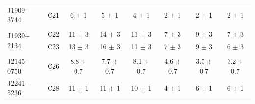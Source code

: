 \documentclass[useAMS,usenatbib]{mn2e}
\begin{document}
\begin{table}
\begin{center}
\begin{tabular}{lccccccc}
J1909$-$3744                  & C21  &6    $\pm$ 1   & 5    $\pm$ 1   & 4    $\pm$ 1    & 2    $\pm$ 1   & 2   $\pm$ 1   & 2   $\pm$ 1   \\ 
                              &      &               &                &                 &                &               &               \\
\multirow{2}{*}{J1939$+$2134} & C22  &11   $\pm$ 3   & 14   $\pm$ 3   & 11   $\pm$ 3    & 7    $\pm$ 3   & 9   $\pm$ 3   & 7   $\pm$ 3   \\ 
                              & C23  &13   $\pm$ 3   & 16   $\pm$ 3   & 11   $\pm$ 3    & 7    $\pm$ 3   & 9   $\pm$ 3   & 6   $\pm$ 3   \\ 
                              &      &               &                &                 &                &               &               \\
J2145$-$0750                  & C26  &8.8  $\pm$ 0.7 & 7.7  $\pm$ 0.7 & 8.1  $\pm$ 0.7  & 4.6  $\pm$ 0.7 & 3.5 $\pm$ 0.7 & 3.2 $\pm$ 0.7 \\ 
J2241$-$5236                  & C28  &11   $\pm$ 1   & 11   $\pm$ 1   & 10   $\pm$ 1    & 4    $\pm$ 1   & 6   $\pm$ 1   & 6   $\pm$ 1   \\ 
\hline                                                                                                         
\end{tabular}
\end{center}
\end{table}
\end{document}
